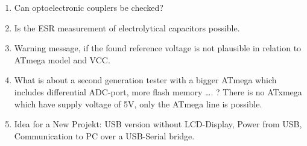\begin{enumerate}
\item Can optoelectronic couplers be checked?  
\item Is the ESR measurement of electrolytical capacitors  possible.
\item Warning message, if the found reference voltage is not plausible in relation to ATmega model and VCC.
\item What is about a second generation tester with a bigger ATmega which includes differential ADC-port, more flash memory …. ?
There is no ATxmega which have supply voltage of 5V, only the ATmega line  is possible. 
\item Idea for a New Projekt: USB  version without LCD-Display, Power from USB, Communication to PC over a USB-Serial bridge.
\end{enumerate}
